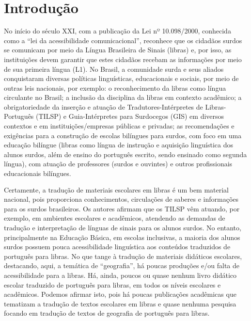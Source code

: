 \documentclass[portuguese]{textolivre}
\begin{document}
\section{Introdução}\label{sec-intro}
No início do século XXI, com a publicação da Lei nº 10.098/2000, conhecida como a “lei da acessibilidade comunicacional”, reconhece que os cidadãos surdos se comunicam por meio da Língua Brasileira de Sinais (libras) e, por isso, as instituições devem garantir que estes cidadãos recebam as informações por meio de sua primeira língua (L1). No Brasil, a comunidade surda e seus aliados conquistaram diversas políticas linguísticas, educacionais e sociais, por meio de outras leis nacionais, por exemplo: o reconhecimento da libras como língua circulante no Brasil; a inclusão da disciplina da libras em contexto acadêmico; a obrigatoriedade da inserção e atuação de Tradutores-Intérpretes de Libras-Português (TILSP) e Guia-Intérpretes para Surdocegos (GIS) em diversos contextos e em instituições/empresas públicas e privadas; as recomendações e exigências para a construção de escolas bilíngues para surdos, com foco em uma educação bilíngue (libras como língua de instrução e aquisição linguística dos alunos surdos, além de ensino do português escrito, sendo ensinado como segunda língua), com atuação de professores (surdos e ouvintes) e outros profissionais educacionais bilíngues. 

Certamente, a tradução de materiais escolares em libras é um bem material nacional, pois proporciona conhecimentos, circulações de saberes e informações para os surdos brasileiros. Os autores \textcite{rodrigues2018interpretacao} afirmam que os TILSP vêm atuando, por exemplo, em ambientes escolares e acadêmicos, atendendo as demandas de tradução e interpretação de línguas de sinais para os alunos surdos. No entanto, principalmente na Educação Básica, em escolas inclusivas, a maioria dos alunos surdos possuem pouca acessibilidade linguística aos conteúdos traduzidos de português para libras. No que tange à tradução de materiais didáticos escolares, destacando, aqui, a temática de “geografia”, há poucas produções e/ou falta de acessibilidade para a libras. Há, ainda, poucos ou quase nenhum livro didático escolar traduzido de português para libras, em todos os níveis escolares e acadêmicos. Podemos afirmar isto, pois há poucas publicações acadêmicas que tematizam a tradução de textos escolares em libras \cite{galasso2018materiais,silva2020materiais,baalbaki2024acessibilidade} e quase nenhuma pesquisa focando em tradução de textos de geografia de português para libras. 
\end{document}
